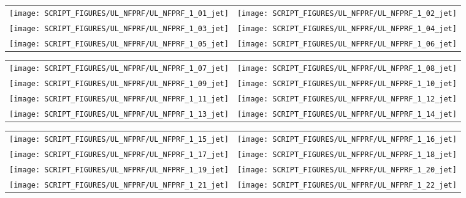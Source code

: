 \begin{figure}[h!]
\begin{tabular*}{\textwidth}{l@{\extracolsep{\fill}}r}
\texttt{[image: SCRIPT\_FIGURES/UL\_NFPRF/UL\_NFPRF\_1\_01\_jet]} &
\texttt{[image: SCRIPT\_FIGURES/UL\_NFPRF/UL\_NFPRF\_1\_02\_jet]} \\
\texttt{[image: SCRIPT\_FIGURES/UL\_NFPRF/UL\_NFPRF\_1\_03\_jet]} &
\texttt{[image: SCRIPT\_FIGURES/UL\_NFPRF/UL\_NFPRF\_1\_04\_jet]} \\
\texttt{[image: SCRIPT\_FIGURES/UL\_NFPRF/UL\_NFPRF\_1\_05\_jet]} &
\texttt{[image: SCRIPT\_FIGURES/UL\_NFPRF/UL\_NFPRF\_1\_06\_jet]}
\end{tabular*}
\label{UL_NFPRF_jet_1}
\end{figure}

\newpage

\begin{figure}[!ht]
\begin{tabular*}{\textwidth}{l@{\extracolsep{\fill}}r}
\texttt{[image: SCRIPT\_FIGURES/UL\_NFPRF/UL\_NFPRF\_1\_07\_jet]} &
\texttt{[image: SCRIPT\_FIGURES/UL\_NFPRF/UL\_NFPRF\_1\_08\_jet]} \\
\texttt{[image: SCRIPT\_FIGURES/UL\_NFPRF/UL\_NFPRF\_1\_09\_jet]} &
\texttt{[image: SCRIPT\_FIGURES/UL\_NFPRF/UL\_NFPRF\_1\_10\_jet]} \\
\texttt{[image: SCRIPT\_FIGURES/UL\_NFPRF/UL\_NFPRF\_1\_11\_jet]} &
\texttt{[image: SCRIPT\_FIGURES/UL\_NFPRF/UL\_NFPRF\_1\_12\_jet]} \\
\texttt{[image: SCRIPT\_FIGURES/UL\_NFPRF/UL\_NFPRF\_1\_13\_jet]} &
\texttt{[image: SCRIPT\_FIGURES/UL\_NFPRF/UL\_NFPRF\_1\_14\_jet]}
\end{tabular*}
\label{UL_NFPRF_jet_2}
\end{figure}

\begin{figure}[!ht]
\begin{tabular*}{\textwidth}{l@{\extracolsep{\fill}}r}
\texttt{[image: SCRIPT\_FIGURES/UL\_NFPRF/UL\_NFPRF\_1\_15\_jet]} &
\texttt{[image: SCRIPT\_FIGURES/UL\_NFPRF/UL\_NFPRF\_1\_16\_jet]} \\
\texttt{[image: SCRIPT\_FIGURES/UL\_NFPRF/UL\_NFPRF\_1\_17\_jet]} &
\texttt{[image: SCRIPT\_FIGURES/UL\_NFPRF/UL\_NFPRF\_1\_18\_jet]} \\
\texttt{[image: SCRIPT\_FIGURES/UL\_NFPRF/UL\_NFPRF\_1\_19\_jet]} &
\texttt{[image: SCRIPT\_FIGURES/UL\_NFPRF/UL\_NFPRF\_1\_20\_jet]} \\
\texttt{[image: SCRIPT\_FIGURES/UL\_NFPRF/UL\_NFPRF\_1\_21\_jet]} &
\texttt{[image: SCRIPT\_FIGURES/UL\_NFPRF/UL\_NFPRF\_1\_22\_jet]}
\end{tabular*}
\label{UL_NFPRF_jet_3}
\end{figure}


